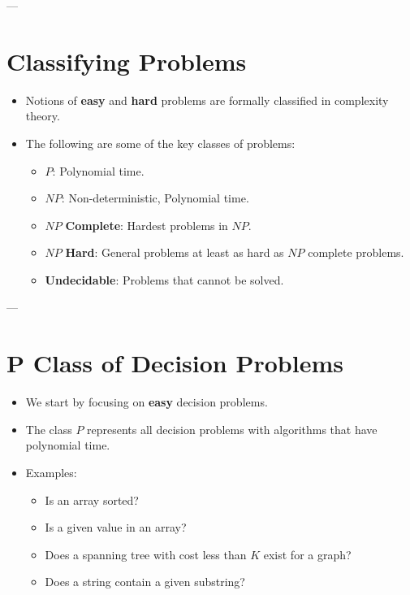 \documentclass[a4paper,12pt]{article}
\begin{document}
---

\section*{Classifying Problems}

\begin{itemize}[label=$\bullet$]
    \item Notions of \textbf{easy} and \textbf{hard} problems are formally classified in complexity theory.
    \item The following are some of the key classes of problems:
    \begin{itemize}
        \item \(P\): Polynomial time.
        \item \(NP\): Non-deterministic, Polynomial time.
        \item \(NP\) \textbf{Complete}: Hardest problems in \(NP\).
        \item \(NP\) \textbf{Hard}: General problems at least as hard as \(NP\) complete problems.
        \item \textbf{Undecidable}: Problems that cannot be solved.
    \end{itemize}
\end{itemize}

---

\section*{P Class of Decision Problems}

\begin{itemize}[label=$\bullet$]
    \item We start by focusing on \textbf{easy} decision problems.
    \item The class \(P\) represents all decision problems with algorithms that have polynomial time.
    \item Examples:
    \begin{itemize}
        \item Is an array sorted?
        \item Is a given value in an array?
        \item Does a spanning tree with cost less than \(K\) exist for a graph?
        \item Does a string contain a given substring?
    \end{itemize}
\end{itemize}
\end{document}
